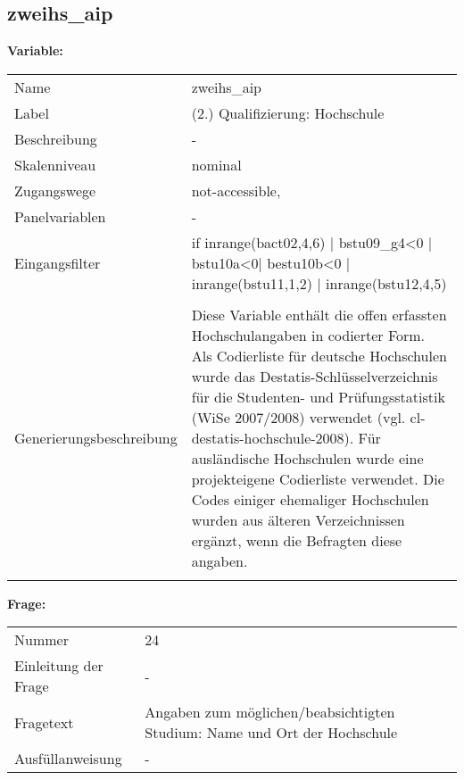 	
	
	\subsection{zweihs\_aip}
	\label{subSection:zweihs_aip}

	\noindent\textbf{Variable:}\\
		\begin{tabular}{lL{11.3cm}}
			\label{tableVariable:zweihs_aip}
			Name & zweihs\_aip \\
			Label & (2.) Qualifizierung: Hochschule \\
			Beschreibung & - \\
			Skalenniveau & nominal \\
			Zugangswege &
				not-accessible,
 \\
			Panelvariablen & -
			 \\
			Eingangsfilter & if inrange(bact02,4,6) | bstu09\_g4\textless{}0 | bstu10a\textless{}0| bestu10b\textless{}0 | inrange(bstu11,1,2) | inrange(bstu12,4,5) \\
 \\
					Generierungsbeschreibung & Diese Variable enthält die offen erfassten Hochschulangaben in codierter Form. Als Codierliste für deutsche Hochschulen wurde das Destatis-Schlüsselverzeichnis für die Studenten- und Prüfungsstatistik (WiSe 2007/2008) verwendet (vgl. cl-destatis-hochschule-2008). Für ausländische Hochschulen wurde eine projekteigene Codierliste verwendet. Die Codes einiger ehemaliger Hochschulen wurden aus älteren Verzeichnissen ergänzt, wenn die Befragten diese angaben.
				 \\	
			 \\
		\end{tabular}

		\vspace*{1 cm}
		\noindent\textbf{Frage:}\\
		\begin{tabular}{lL{11.3cm}}
			\label{tableQuestion:zweihs_aip}
			Nummer & 24 \\
			Einleitung der Frage & - \\
			Fragetext & Angaben zum möglichen/beabsichtigten Studium:
Name und Ort der Hochschule \\
			Ausfüllanweisung & - \\
		\end{tabular}





	
	\newpage

